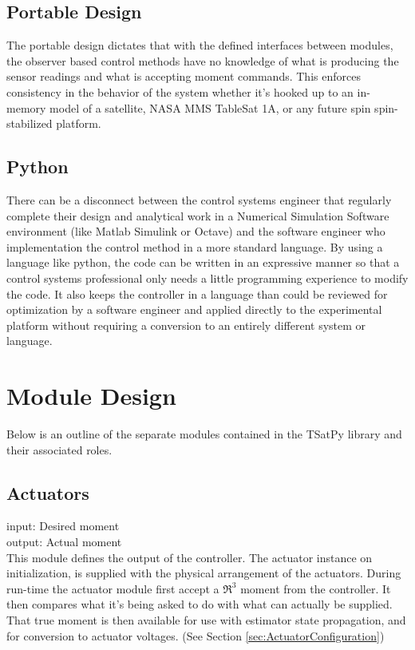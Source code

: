 \subsection{Portable Design}

The portable design dictates that with the defined interfaces between modules, the observer based control methods have no knowledge of what is producing the sensor readings and what is accepting moment commands. This enforces consistency in the behavior of the system whether it's hooked up to an in-memory model of a satellite, NASA MMS TableSat 1A, or any future spin spin-stabilized platform.

\subsection{Python}

There can be a disconnect between the control systems engineer that regularly complete their design and analytical work in a Numerical Simulation Software environment (like Matlab Simulink or Octave) and the software engineer who implementation the control method in a more standard language. By using a language like python, the code can be written in an expressive manner so that a control systems professional only needs a little programming experience to modify the code. It also keeps the controller in a language than could be reviewed for optimization by a software engineer and applied directly to the experimental platform without requiring a conversion to an entirely different system or language.


\section{Module Design}
\label{sec:Module Design}

Below is an outline of the separate modules contained in the TSatPy library and their associated roles.

\subsection{Actuators}
\label{subsec:actuators}

input: Desired moment\\
output: Actual moment\\

This module defines the output of the controller. The actuator instance on initialization, is supplied with the physical arrangement of the actuators. During run-time the actuator module first accept a $\Re^3$ moment from the controller.  It then compares what it's being asked to do with what can actually be supplied.  That true moment is then available for use with estimator state propagation, and for conversion to actuator voltages. (See Section \ref{sec:ActuatorConfiguration})

